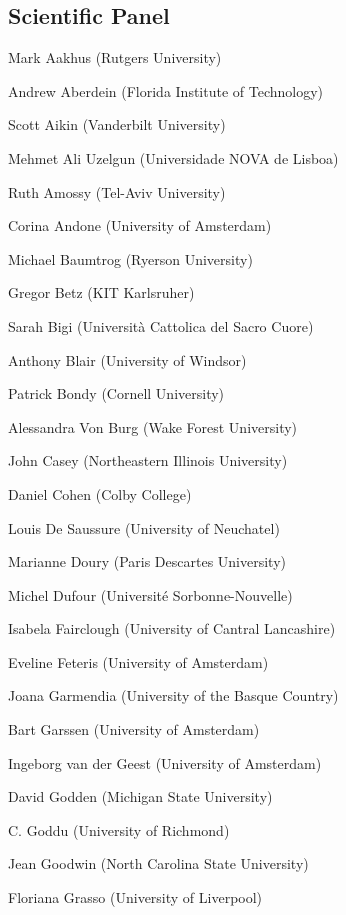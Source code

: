 	\subsection*{Scientific Panel}
	\begin{compactitem}[]
		\item[] Mark Aakhus (Rutgers University)
		\item[] Andrew Aberdein (Florida Institute of Technology)
		\item[] Scott Aikin (Vanderbilt University)
		\item[] Mehmet Ali Uzelgun (Universidade NOVA de Lisboa)
		\item[] Ruth Amossy (Tel-Aviv University)
		\item[] Corina Andone (University of Amsterdam)
		\item[] Michael Baumtrog (Ryerson University)
		\item[] Gregor Betz (KIT Karlsruher)
		\item[] Sarah Bigi (Università Cattolica del Sacro Cuore)
		\item[] Anthony Blair (University of Windsor)
		\item[] Patrick Bondy (Cornell University)
		\item[] Alessandra Von Burg (Wake Forest University)
		\item[] John Casey (Northeastern Illinois University)
		\item[] Daniel Cohen (Colby College)
		\item[] Louis De Saussure (University of Neuchatel)
		\item[] Marianne Doury (Paris Descartes University)
		\item[] Michel Dufour (Université Sorbonne-Nouvelle)
		\item[] Isabela Fairclough (University of Cantral Lancashire)
		\item[] Eveline Feteris (University of Amsterdam)
		\item[] Joana Garmendia (University of the Basque Country)
		\item[] Bart Garssen (University of Amsterdam)
		\item[] Ingeborg van der Geest (University of Amsterdam)
		\item[] David Godden (Michigan State University)
		\item[] C. Goddu (University of Richmond)
		\item[] Jean Goodwin (North Carolina State University)
		\item[] Floriana Grasso (University of Liverpool)

\end{compactitem}
